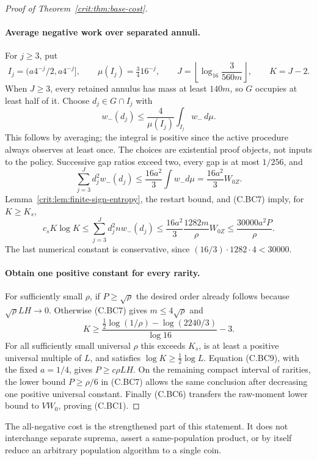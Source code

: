 \begin{proof}[Proof of Theorem~\ref{crit:thm:base-cost}]
\paragraph{Average negative work over separated annuli.}
For $j\ge3$, put
\[
 I_j=(a4^{-j}/2,a4^{-j}],\qquad
 \mu(I_j)=\tfrac34 16^{-j},\qquad
 J=\left\lfloor\log_{16}\frac3{560m}\right\rfloor,
 \qquad K=J-2.
\]
When $J\ge3$, every retained annulus has mass at least $140m$, so
$G$ occupies at least half of it. Choose $d_j\in G\cap I_j$ with
\[
 w_-(d_j)\le\frac4{\mu(I_j)}\int_{I_j}w_-\,d\mu.
\]
This follows by averaging; the integral is positive since the active
procedure always observes at least once. The choices are existential
proof objects, not inputs to the policy. Successive gap ratios exceed
two, every gap is at most $1/256$, and
\[
 \sum_{j=3}^Jd_j^2w_-(d_j)
       \le\frac{16a^2}{3}\int w_-d\mu
       =\frac{16a^2}{3}W_{0Z}.
\]
Lemma~\ref{crit:lem:finite-sign-entropy}, the restart bound, and (C.BC7) imply,
for $K\ge K_s$,
\[
 c_sK\log K
 \le\sum_{j=3}^Jd_j^2nw_-(d_j)
 \le\frac{16a^2}{3}\frac{1282m}{\rho}W_{0Z}
 \le\frac{30000a^2P}{\rho}.                            \tag{C.BC9}
\]
The last numerical constant is conservative, since
$(16/3)\cdot1282\cdot4<30000$.

\paragraph{Obtain one positive constant for every rarity.}
For sufficiently small $\rho$, if $P\ge\sqrt\rho$ the desired order
already follows because $\sqrt\rho LH\to0$. Otherwise (C.BC7) gives
$m\le4\sqrt\rho$ and
\[
 K\ge\frac{\tfrac12\log(1/\rho)-\log(2240/3)}{\log16}-3.
\]
For all sufficiently small universal $\rho$ this exceeds $K_s$, is at
least a positive universal multiple of $L$, and satisfies
$\log K\ge\tfrac12\log L$. Equation (C.BC9), with the fixed $a=1/4$,
gives $P\ge c\rho LH$. On the remaining compact interval of rarities,
the lower bound $P\ge\rho/6$ in (C.BC7) allows the same conclusion after
decreasing one positive universal constant. Finally (C.BC6) transfers the
raw-moment lower bound to $VW_0$, proving (C.BC1).
\end{proof}

The all-negative cost is the strengthened part of this statement. It
does not interchange separate suprema, assert a same-population product,
or by itself reduce an arbitrary population algorithm to a single coin.

